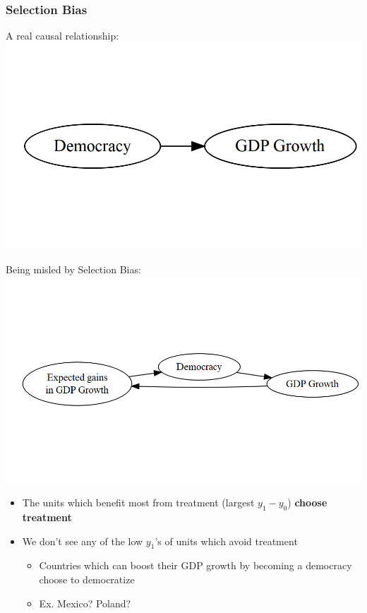 \documentclass[xcolor=x11names,compress]{beamer}\usepackage[]{graphicx}\usepackage[]{xcolor}
\makeatletter
\def\maxwidth{ %
  \ifdim\Gin@nat@width>\linewidth
    \linewidth
  \else
    \Gin@nat@width
  \fi
}
\newenvironment{knitrout}{}{} %
\renewcommand{\(}{\begin{columns}}
\renewcommand{\)}{\end{columns}}
\newcommand{\<}[1]{\begin{column}{#1}}
\renewcommand{\>}{\end{column}}
\makeatother
\begin{document}
\begin{frame}
\frametitle{Selection Bias}
\begin{multicols}{2}
A real causal relationship:
\begin{knitrout}
\color{fgcolor}
\includegraphics[width=\maxwidth]{figure/explanation9b-1} 
\end{knitrout}
\columnbreak

Being misled by Selection Bias:
\begin{knitrout}
\color{fgcolor}
\includegraphics[width=\maxwidth]{figure/explanation10b-1} 
\end{knitrout}
\end{multicols}
\begin{itemize}
\pause
\item The units which benefit most from treatment (largest $y_1-y_0$) \textbf{choose treatment}
\pause
\item We don't see any of the low $y_1$'s of units which avoid treatment
\begin{itemize}
\pause
\item Countries which can boost their GDP growth by becoming a democracy choose to democratize
\pause
\item Ex. Mexico? Poland?
\end{itemize}
\end{itemize}
\end{frame}
\end{document}
